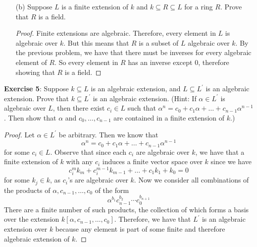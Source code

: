 \documentclass{article}
\begin{document}
\begin{itemize}
        \item [(b)] Suppose $L$ is a finite extension of $k$ and $k \subseteq R \subseteq L$ for a ring $R$. Prove that $R$ is a field.
            \begin{proof}
                Finite extensions are algebraic. Therefore, every element in $L$ is algebraic over $k$. But this means that $R$ is a subset of $L$ algebraic over $k$. By the previous problem, we have that there must be inverses for every algebraic element of $R$. So every element in $R$ has an inverse except $0$, therefore showing that $R$ is a field.
            \end{proof}
    \end{itemize}

\textbf{Exercise 5}: Suppose $k \subseteq L$ is an algebraic extension, and $L \subseteq L^{\prime}$ is an algebraic extension. Prove that $k \subseteq L^{\prime}$ is an algebraic extension. (Hint: If $\alpha \in L^{\prime}$ is algebraic over $L$, then there exist $c_{i} \in L$ such that $\alpha^{n} = c_{0} + c_{1}\alpha + \ldots  + c_{n - 1}\alpha^{n - 1}$. Then show that $\alpha$ and $c_{0}, \ldots , c_{n - 1}$ are contained in a finite extension of $k$.)
    \begin{proof}
        Let $\alpha \in L^{\prime}$ be arbitrary. Then we know that
            \begin{equation*}
                \alpha^{n} = c_{0} + c_{1}\alpha + \ldots  + c_{n - 1}\alpha^{n - 1}
            \end{equation*}
        for some $c_{i} \in L$. Observe that since each $c_{i}$ are algebraic over $k$, we have that a finite extension of $k$ with any $c_{i}$ induces a finite vector space over $k$ since we have
            \begin{equation*}
                c_{i}^{m}k_{m} + c_{i}^{m - 1}k_{m - 1} + \ldots + c_{1}k_{1} + k_{0} = 0
            \end{equation*}
        for some $k_{j} \in k$, as $c_{i}$'s are algebraic over $k$. Now we consider all combinations of the products of $\alpha, c_{n - 1}, \ldots , c_{0}$ of the form
            \begin{equation*}
                \alpha^{b_{1}}c_{n - 1}^{b_{2}}\cdots c_{0}^{b_{n + 1}}
            \end{equation*}
        There are a finite number of such products, the collection of which forms a basis over the extension $k[\alpha, c_{n - 1}, \ldots , c_{0}]$. Therefore, we have that $L^{\prime}$ is an algebraic extension over $k$ because any element is part of some finite and therefore algebraic extension of $k$.
    \end{proof}
\end{document}
